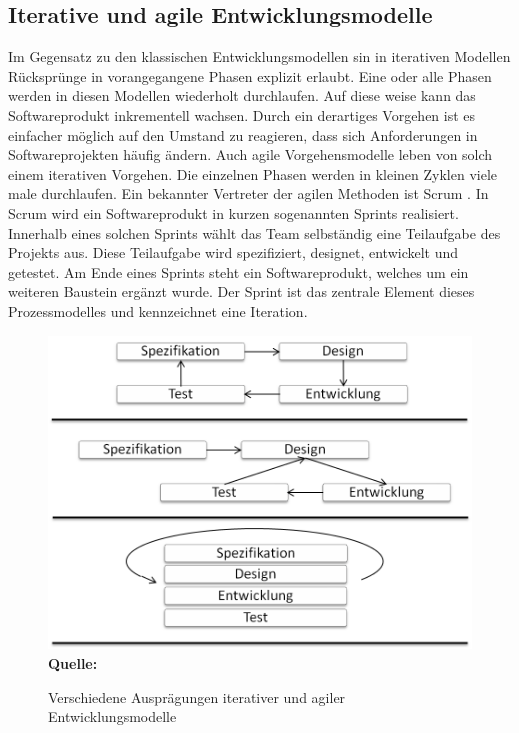 \subsection{Iterative und agile Entwicklungsmodelle}
\label{subsec:iterative_und_agile_entwicklungsmodelle}
Im Gegensatz zu den klassischen Entwicklungsmodellen sin in iterativen Modellen Rücksprünge in vorangegangene Phasen explizit erlaubt. Eine oder alle Phasen werden in diesen Modellen wiederholt durchlaufen. Auf diese weise kann das Softwareprodukt inkrementell wachsen. Durch ein derartiges Vorgehen ist es einfacher möglich auf den Umstand zu reagieren, dass sich Anforderungen in Softwareprojekten häufig ändern. Auch agile Vorgehensmodelle leben von solch einem iterativen Vorgehen. Die einzelnen Phasen werden in kleinen Zyklen viele male durchlaufen.
Ein bekannter Vertreter der agilen Methoden ist Scrum \cite{schwaber_agile_2002}. In Scrum wird ein Softwareprodukt in kurzen sogenannten Sprints realisiert. Innerhalb eines solchen Sprints wählt das Team selbständig eine Teilaufgabe des Projekts aus. Diese Teilaufgabe wird spezifiziert, designet, entwickelt und getestet. Am Ende eines Sprints steht ein Softwareprodukt, welches um ein weiteren Baustein ergänzt wurde.
Der Sprint ist das zentrale Element dieses Prozessmodelles und kennzeichnet eine Iteration.
\begin{figure}[htb]
  \centering  
  \includegraphics[scale=0.8]{img/iterativeentwicklungsmodelle.png}\\
  \footnotesize\sffamily\textbf{Quelle:} \cite[vgl. S.24]{seidl_basiswissen_2012}
  \caption{Verschiedene Ausprägungen iterativer und agiler Entwicklungsmodelle}
  \label{fig:verschiedene_auspraegungen_iterativer_und_agiler_entwicklungsmodelle}
\end{figure}
